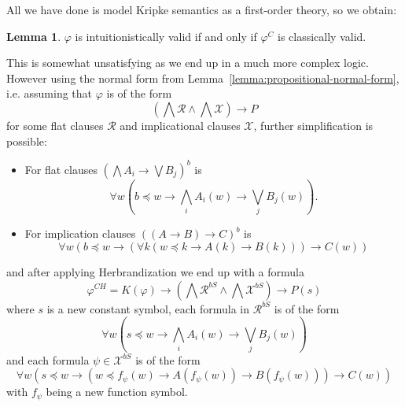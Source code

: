 \documentclass{easychair}
\theoremstyle{definition}
\theoremstyle{definition}
\theoremstyle{definition}
\newtheorem{lemma}[theorem]{Lemma}
\theoremstyle{definition}
\theoremstyle{definition}
\theoremstyle{definition}
\theoremstyle{definition}
\begin{document}
\noindent All we have done is model Kripke semantics as a first-order theory, so we obtain:

\begin{lemma}
	$\varphi$ is intuitionistically valid if and only if $\varphi^C$ is classically valid.
\end{lemma}

This is somewhat unsatisfying as we end up in a much more complex logic. However using the normal form from Lemma~\ref{lemma:propositional-normal-form}, i.e. assuming that $\varphi$ is of the form $$\left(\bigwedge\mathcal R\wedge\bigwedge\mathcal X\right)\to P$$ for some flat clauses $\mathcal R$ and implicational clauses $\mathcal X$, further simplification is possible:
\begin{itemize}\addtolength{\itemsep}{-5pt}
	\item For flat clauses $(\bigwedge A_i\to\bigvee B_j)^b$ is
	$$\forall w\left(b\preceq w\to\bigwedge_i A_i(w)\to\bigvee_jB_j(w)\right).$$
	\item For implication clauses $((A\to B)\to C)^b$ is
	$$\forall w(b\preceq w\to(\forall k(w\preceq k\to A(k)\to B(k)))\to C(w))$$
\end{itemize}

and after applying Herbrandization we end up with a formula $$\varphi^{CH} = K(\varphi)\to\left(\bigwedge\mathcal R^{b S}\wedge \bigwedge\mathcal X^{b S}\right)\to P(s)$$ where $s$ is a new constant symbol, each formula in $\mathcal R^{b S}$ is of the form
$$\forall w\left(s\preceq w\to\bigwedge_iA_i(w)\to\bigvee_jB_j(w)\right)$$
and each formula $\psi\in\mathcal X^{b S}$ is of the form
$$\forall w(s\preceq w\to(w\preceq f_\psi(w)\to A(f_\psi(w))\to B(f_\psi(w)))\to C(w))$$
with $f_\psi$ being a new function symbol.
\end{document}
